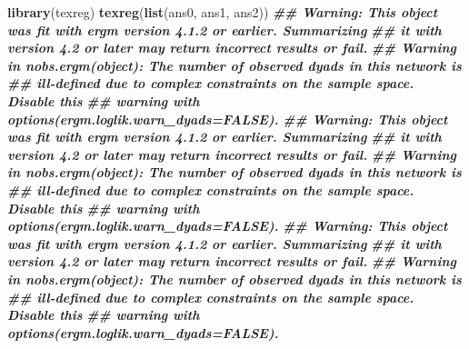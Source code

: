\documentclass[
]{book}
\newenvironment{Shaded}{\begin{snugshade}}{\end{snugshade}}
\newcommand{\DocumentationTok}[1]{\textcolor[rgb]{0.56,0.35,0.01}{\textbf{\textit{#1}}}}
\newcommand{\FunctionTok}[1]{\textcolor[rgb]{0.13,0.29,0.53}{\textbf{#1}}}
\newcommand{\NormalTok}[1]{#1}
\begin{document}
\begin{Shaded}
\begin{Highlighting}[]
\FunctionTok{library}\NormalTok{(texreg)}
\FunctionTok{texreg}\NormalTok{(}\FunctionTok{list}\NormalTok{(ans0, ans1, ans2))}
\DocumentationTok{\#\# Warning: This object was fit with \textquotesingle{}ergm\textquotesingle{} version 4.1.2 or earlier. Summarizing}
\DocumentationTok{\#\# it with version 4.2 or later may return incorrect results or fail.}
\DocumentationTok{\#\# Warning in nobs.ergm(object): The number of observed dyads in this network is}
\DocumentationTok{\#\# ill{-}defined due to complex constraints on the sample space. Disable this}
\DocumentationTok{\#\# warning with \textquotesingle{}options(ergm.loglik.warn\_dyads=FALSE)\textquotesingle{}.}
\DocumentationTok{\#\# Warning: This object was fit with \textquotesingle{}ergm\textquotesingle{} version 4.1.2 or earlier. Summarizing}
\DocumentationTok{\#\# it with version 4.2 or later may return incorrect results or fail.}
\DocumentationTok{\#\# Warning in nobs.ergm(object): The number of observed dyads in this network is}
\DocumentationTok{\#\# ill{-}defined due to complex constraints on the sample space. Disable this}
\DocumentationTok{\#\# warning with \textquotesingle{}options(ergm.loglik.warn\_dyads=FALSE)\textquotesingle{}.}
\DocumentationTok{\#\# Warning: This object was fit with \textquotesingle{}ergm\textquotesingle{} version 4.1.2 or earlier. Summarizing}
\DocumentationTok{\#\# it with version 4.2 or later may return incorrect results or fail.}
\DocumentationTok{\#\# Warning in nobs.ergm(object): The number of observed dyads in this network is}
\DocumentationTok{\#\# ill{-}defined due to complex constraints on the sample space. Disable this}
\DocumentationTok{\#\# warning with \textquotesingle{}options(ergm.loglik.warn\_dyads=FALSE)\textquotesingle{}.}
\end{Highlighting}
\end{Shaded}
\end{document}
